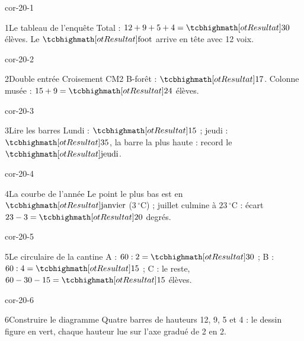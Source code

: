 \clearpage\pagestyle{otMain}\setlength{\otBlocEspacement}{2.5mm}\fontsize{11}{15}\selectfont{}
\begin{blocLivre}{cor-20-1}\begin{corrige}{1}{Le tableau de l’enquête}
Total : $12+9+5+4=\res{30}$ élèves. Le $\res{\text{foot}}$ arrive en tête avec 12 voix.
\end{corrige}\end{blocLivre}
\begin{blocLivre}{cor-20-2}\begin{corrige}{2}{Double entrée}
Croisement CM2 B-forêt : $\res{17}$. Colonne musée : $15+9=\res{24}$ élèves.
\end{corrige}\end{blocLivre}
\begin{blocLivre}{cor-20-3}\begin{corrige}{3}{Lire les barres}
Lundi : $\res{15}$ ; jeudi : $\res{35}$, la barre la plus haute : record le $\res{\text{jeudi}}$.
\label{fig-cor-20-3}
\end{corrige}\end{blocLivre}
\begin{blocLivre}{cor-20-4}\begin{corrige}{4}{La courbe de l’année}
Le point le plus bas est en $\res{\text{janvier}}$ ($3\,^\circ$C) ; juillet culmine à $23\,^\circ$C : écart $23-3=\res{20}$ degrés.
\label{fig-cor-20-4}
\end{corrige}\end{blocLivre}
\begin{blocLivre}{cor-20-5}\begin{corrige}{5}{Le circulaire de la cantine}
A : $60:2=\res{30}$ ; B : $60:4=\res{15}$ ; C : le reste, $60-30-15=\res{15}$ élèves.
\label{fig-cor-20-5}
\end{corrige}\end{blocLivre}
\begin{blocLivre}{cor-20-6}\begin{corrige}{6}{Construire le diagramme}
Quatre barres de hauteurs 12, 9, 5 et 4 : le dessin figure en vert, chaque hauteur lue sur l’axe gradué de 2 en 2.
\label{fig-cor-20-6}
\end{corrige}\end{blocLivre}
